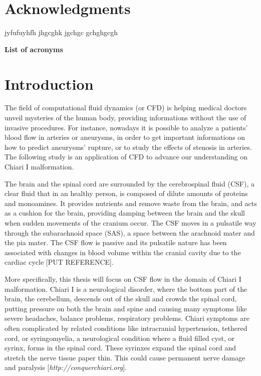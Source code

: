 \documentclass[a4paper,11pt,openright,twoside]{book}
\begin{document}
\chapter*{\LARGE Acknowledgments}
jyfufuyhfh
jhgcghk
jgchgc
gchghgcgh

\newpage

{\Large \textbf{List of acronyms}}



\newpage
\tableofcontents


\newpage
{}

\chapter{Introduction}
The field of computational fluid dynamics (or CFD) is helping medical doctors unveil mysteries of the human body, providing informations without the use of invasive procedures. For instance, nowadays it is possible to analyze a patients' blood flow in arteries or aneurysms, in order to get important informations on how to predict  aneurysms' rupture, or to study the effects of stenosis in arteries. The following study is an application of CFD to advance our understanding on Chiari I malformation.

The brain and the spinal cord are surrounded by the cerebrospinal fluid (CSF), a clear fluid that in an healthy person, is composed of dilute amounts of proteins and monoamines. It provides nutrients and remove waste from the brain, and acts as a cushion for the brain, providing damping between the brain and the skull when sudden movements of the cranium occur. The CSF moves in a pulsatile way through the subarachnoid space (SAS), a space between the arachnoid mater and the pia mater. The CSF flow is passive and its pulsatile nature has been associated with changes in blood volume within the cranial cavity due to the cardiac cycle [PUT REFERENCE].

More specifically, this thesis will focus on CSF flow in the domain of Chiari I malformation. Chiari I is a neurological disorder, where the bottom part of the brain, the cerebellum, descends out of the skull and crowds the spinal cord, putting pressure on both the brain and spine and causing many symptoms like severe headaches, balance problems, respiratory problems. Chiari symptoms are often complicated by related conditions like intracranial hypertension, tethered cord, or syringomyelia, a neurological condition where a fluid filled cyst, or syrinx, forms in the spinal cord. These syrinxes expand the spinal cord and stretch the nerve tissue paper thin. This could cause permanent nerve damage and paralysis [\emph{http://conquerchiari.org}].
\end{document}
